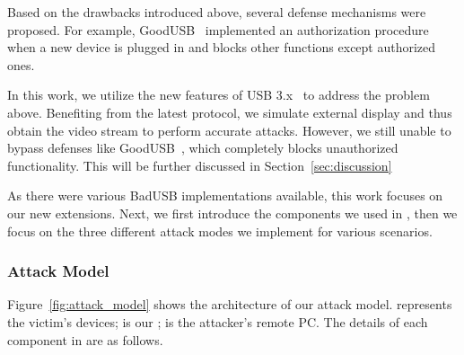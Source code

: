 Based on the drawbacks introduced above, several defense mechanisms were
proposed. For example, GoodUSB~\cite{tian2015defending}
implemented an authorization procedure when a new device is plugged in and blocks other functions except authorized ones.

In this work, we utilize the new features of \ac{USB} 3.x~\cite{usb31,usb32} to
address the problem above.  Benefiting from the latest protocol, we simulate
external display and thus obtain the video stream to perform accurate
attacks. However, we still unable to bypass defenses like GoodUSB~\cite{tian2015defending}, which completely blocks unauthorized functionality. This will be further discussed in Section~\ref{sec:discussion}

As there were various BadUSB implementations available, this work focuses on our new extensions. Next, we first introduce the
components we used in \tool, then we focus on the three different attack modes
we implement for various scenarios.

\subsubsection{Attack Model}

Figure~\ref{fig:attack_model} shows the architecture of our attack model.  represents the victim's devices;  is our \tool;  is the attacker's remote PC. The details of each component in \tool are as follows.


